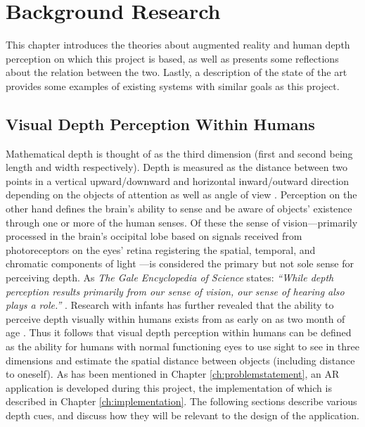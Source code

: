 \chapter{Background Research}\label{ch:backgroundresearch}
This chapter introduces the theories about augmented reality and human depth perception on which this project is based, as well as presents some reflections about the relation between the two. Lastly, a description of the state of the art provides some examples of existing systems with similar goals as this project.

\section{Visual Depth Perception Within Humans}
Mathematical depth is thought of as the third dimension (first and second being length and width respectively). Depth is measured as the distance between two points in a vertical upward/downward and horizontal inward/outward direction depending on the objects of attention as well as angle of view \cite{Gale}. Perception on the other hand defines the brain’s ability to sense and be aware of objects' existence through one or more of the human senses. Of these the sense of vision---primarily processed in the brain’s occipital lobe based on signals received from photoreceptors on the eyes’ retina registering the spatial, temporal, and chromatic components of light \cite{Spector2003}---is considered the primary but not sole sense for perceiving depth. As \textit{The Gale Encyclopedia of Science} states: \textit{“While depth perception results primarily from our sense of vision, our sense of hearing also plays a role.”} \cite{Gale}. Research with infants has further revealed that the ability to perceive depth visually within humans exists from as early on as two month of age \cite{Gale}. Thus it follows that visual depth perception within humans can be defined as the ability for humans with normal functioning eyes to use sight to see in three dimensions and estimate the spatial distance between objects (including distance to oneself). As has been mentioned in Chapter \ref{ch:problemstatement}, an AR application is developed during this project, the implementation of which is described in Chapter \ref{ch:implementation}. The following sections describe various depth cues, and discuss how they will be relevant to the design of the application.

